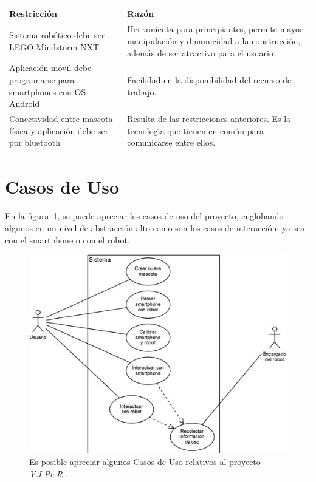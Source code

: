 \documentclass[letterpaper,12pt]{article} %
\numberwithin{equation}{section} %
\numberwithin{figure}{section} %
\numberwithin{table}{section} %
\begin{document}
\begin{table}[H]
  \centering
  \begin{tabular}{p{5cm}p{9cm}}\hline
    Restricci\'on & Raz\'on \\ \hline\hline %
    Sistema rob\'otico debe ser LEGO Mindstorm NXT & Herramienta para principiantes, permite mayor manipulaci\'on y dinamicidad a la construcci\'on, adem\'as de ser atractivo para el usuario.\\ \hline
    Aplicaci\'on m\'ovil debe programarse para smartphones con OS Android & Facilidad en la disponibilidad del recurso de trabajo. \\ \hline
    Conectividad entre mascota f\'isica y aplicaci\'on debe ser por bluetooth & Resulta de las restricciones anteriores. Es la tecnolog\'{\i}a que tienen en com\'un para comunicarse entre ellos.\\ \hline \hline
  \end{tabular}
\end{table}

\newpage
\section{Casos de Uso} %

En la figura~\ref{fig:CasoUso}, se puede apreciar los casos de uso del proyecto, englobando algunos en un nivel de abstracci\'on alto como son los casos de interacci\'on, ya sea con el smartphone o con el robot.\\

\begin{figure}[H]
   \centering
     \includegraphics[scale=1]{CasoUso.jpg}
   \caption{Es posible apreciar algunos Casos de Uso relativos al proyecto \emph{V.I.Pe.R.}.}
   \label{fig:CasoUso}
\end{figure}
\end{document}
